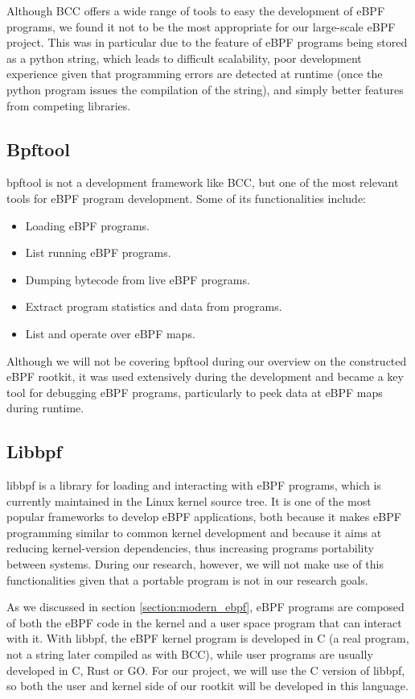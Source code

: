 \documentclass[12pt]{report} %
\begin{document}
Although BCC offers a wide range of tools to easy the development of eBPF programs, we found it not to be the most appropriate for our large-scale eBPF project. This was in particular due to the feature of eBPF programs being stored as a python string, which leads to difficult scalability, poor development experience given that programming errors are detected at runtime (once the python program issues the compilation of the string), and simply better features from competing libraries.

\subsection{Bpftool}
bpftool is not a development framework like BCC, but one of the most relevant tools for eBPF program development. Some of its functionalities include:
\begin{itemize}
\item Loading eBPF programs.
\item List running eBPF programs.
\item Dumping bytecode from live eBPF programs.
\item Extract program statistics and data from programs.
\item List and operate over eBPF maps.
\end{itemize}

Although we will not be covering bpftool during our overview on the constructed eBPF rootkit, it was used extensively during the development and became a key tool for debugging eBPF programs, particularly to peek data at eBPF maps during runtime.

\subsection{Libbpf}
libbpf\cite{libbpf_github} is a library for loading and interacting with eBPF programs, which is currently maintained in the Linux kernel source tree\cite{libbpf_upstream}. It is one of the most popular frameworks to develop eBPF applications, both because it makes eBPF programming similar to common kernel development and because it aims at reducing kernel-version dependencies, thus increasing programs portability between systems\cite{libbpf_core}. During our research, however, we will not make use of this functionalities given that a portable program is not in our research goals.

As we discussed in section \ref{section:modern_ebpf}, eBPF programs are composed of both the eBPF code in the kernel and a user space program that can interact with it. With libbpf, the eBPF kernel program is developed in C (a real program, not a string later compiled as with BCC), while user programs are usually developed in C, Rust or GO. For our project, we will use the C version of libbpf, so both the user and kernel side of our rootkit will be developed in this language.
\end{document}
